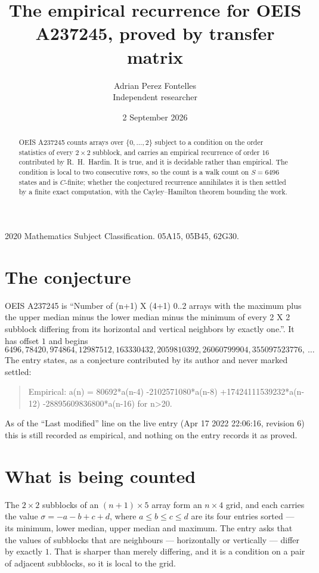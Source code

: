 \documentclass[11pt,a4paper]{article}
\title{The empirical recurrence for OEIS A237245, proved by transfer matrix}
\author{Adrian Perez Fontelles\\ \small Independent researcher}
\date{2 September 2026}
\theoremstyle{plain}
\theoremstyle{definition}
\begin{document}
\maketitle

\begin{abstract}
OEIS A237245 counts arrays over $\{0,\dots,2\}$ subject to a condition on the order
statistics of every $2\times2$ subblock, and carries an empirical recurrence of order
$16$ contributed by R.~H.~Hardin. It is true, and it is decidable rather than empirical.
The condition is local to two consecutive rows, so the count is a walk count on $S=6496$
states and is $C$-finite; whether the conjectured recurrence annihilates it is then settled by
a finite exact computation, with the Cayley--Hamilton theorem bounding the work.
\end{abstract}

\noindent\small 2020 Mathematics Subject Classification. 05A15, 05B45, 62G30.\normalsize

\section{The conjecture}

OEIS A237245 is ``Number of (n+1) X (4+1) 0..2 arrays with the maximum plus the upper median minus the lower median minus the minimum of every 2 X 2 subblock differing from its horizontal and vertical neighbors by exactly one.''. It has offset $1$ and begins
\[
6496, 78420, 974864, 12987512, 163330432, 2059810392, 26060799904, 355097523776,\ \dots
\]
The entry states, as a conjecture contributed by its author and never marked settled:
\begin{quote}
Empirical: a(n) = 80692*a(n-4) -2102571080*a(n-8) +17424111539232*a(n-12) -28895609836800*a(n-16) for n>20.
\end{quote}
As of the ``Last modified'' line on the live entry (Apr 17 2022 22:06:16, revision 6) this is still
recorded as empirical, and nothing on the entry records it as proved.

\section{What is being counted}

The $2\times2$ subblocks of an $(n+1)\times5$ array form an
$n\times4$ grid, and each carries the value $\sigma=-a-b+c+d$, where $a\le b\le c\le d$ are its four entries sorted --- its minimum, lower median, upper median and maximum. The entry asks that the values of
subblocks that are neighbours --- horizontally or vertically --- differ by exactly $1$.
That is sharper than merely differing, and it is a condition on a pair of adjacent subblocks,
so it is local to the grid.
\end{document}

